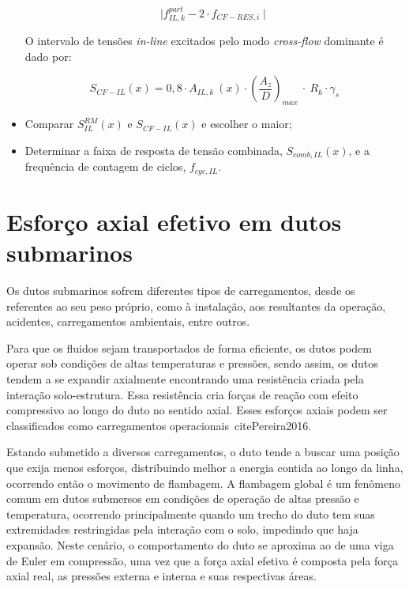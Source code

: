 \begin{itemize}
\[\mid f_{\mathit{IL}, \mathit{k}}^\mathit{part} - 2 \cdot f_{\mathit{CF-RES}, \mathit{i}} \mid\]

O intervalo de tensões \textit{in-line} excitados pelo modo \textit{cross-flow} dominante é dado por:

		\[S_{\mathit{CF}-\mathit{IL}}(x) = 0,8 \cdot A_{\mathit{IL}, \mathit{k}}~(x) \cdot \left(\frac{A_{z}}{D}\right)_\mathit{max}~\cdot~R_k \cdot \gamma_s\]

\item Comparar $S_\mathit{IL}^\mathit{RM}(x)$ e $S_{\mathit{CF}-\mathit{IL}}(x)$ e escolher o maior;
\item Determinar a faixa de resposta de tensão combinada, $S_{\mathit{comb}, \mathit{IL}}(x)$, e a frequência de contagem de ciclos, $f_{\mathit{cyc}, \mathit{IL}}$.
\end{itemize}


\section{Esforço axial efetivo em dutos submarinos}

Os dutos submarinos sofrem diferentes tipos de carregamentos, desde os referentes ao seu peso próprio, como à instalação, aos resultantes da operação, acidentes, carregamentos ambientais, entre outros.

Para que os fluidos sejam transportados de forma eficiente, os dutos podem operar sob condições de altas temperaturas e pressões, sendo assim, os dutos tendem a se expandir axialmente encontrando uma resistência criada pela interação solo-estrutura.
Essa resistência cria forças de reação com efeito compressivo ao longo do duto no sentido axial.
Esses esforços axiais podem ser classificados como carregamentos operacionais~cite{Pereira2016}.

Estando submetido a diversos carregamentos, o duto tende a buscar uma posição que exija menos esforços, distribuindo melhor a energia contida ao longo da linha, ocorrendo então o movimento de flambagem.
A flambagem global é um fenômeno comum em dutos submersos em condições de operação de altas pressão e temperatura, ocorrendo principalmente quando um trecho do duto tem suas extremidades restringidas pela interação com o solo, impedindo que haja expansão.
Neste cenário, o comportamento do duto se aproxima ao de uma viga de Euler em compressão, uma vez que a força axial efetiva é composta pela força axial real, as pressões externa e interna e suas respectivas áreas.

